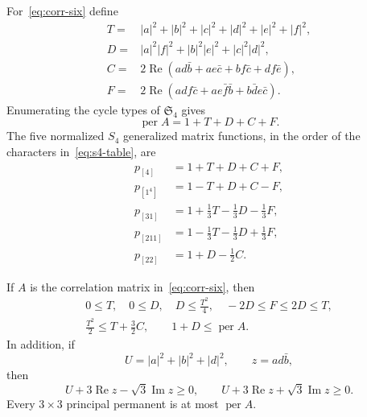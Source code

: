 \documentclass[10pt,twoside]{siamart1116}
\newcommand{\Sn}{\mathfrak S}
\newcommand{\per}{\operatorname{per}}
\newcommand{\Rea}{\operatorname{Re}}
\newcommand{\Ima}{\operatorname{Im}}
\begin{document}
For~\eqref{eq:corr-six} define
\begin{align}
 T={}&|a|^2+|b|^2+|c|^2+|d|^2+|e|^2+|f|^2,\label{eq:T}\\
 D={}&|a|^2|f|^2+|b|^2|e|^2+|c|^2|d|^2,\label{eq:D}\\
 C={}&2\Rea(a d\bar b+a e\bar c+b f\bar c+d f\bar e),\label{eq:C}\\
 F={}&2\Rea(a d f\bar c+a e\bar f\bar b+b\bar d e\bar c).
 \label{eq:F}
\end{align}
Enumerating the cycle types of $\Sn_4$ gives
\begin{equation}\label{eq:per-aggregate}
 \per A=1+T+D+C+F.
\end{equation}
The five normalized $S_4$ generalized matrix functions, in the order of
the characters in~\eqref{eq:s4-table}, are
\begin{align}
 p_{[4]}&=1+T+D+C+F,\nonumber\\
 p_{[1^4]}&=1-T+D+C-F,\nonumber\\
 p_{[31]}&=1+\tfrac13T-\tfrac13D-\tfrac13F,\label{eq:s4-rows}\\
 p_{[211]}&=1-\tfrac13T-\tfrac13D+\tfrac13F,\nonumber\\
 p_{[22]}&=1+D-\tfrac12C.\nonumber
\end{align}

\begin{lemma}\label{lem:scalar-toolbox}
If $A$ is the correlation matrix in~\eqref{eq:corr-six}, then
\begin{gather}
 0\leq T,\quad 0\leq D,\quad
 D\leq\frac{T^2}{4},\quad
 -2D\leq F\leq2D\leq T,
 \label{eq:scalar-basic}\\
 \frac{T^2}{2}\leq T+\frac32C,
 \qquad 1+D\leq\per A.\label{eq:moment-bound}
\end{gather}
In addition, if
\begin{equation}\label{eq:triangle-data}
 U=|a|^2+|b|^2+|d|^2,\qquad z=ad\bar b,
\end{equation}
then
\begin{equation}\label{eq:triangle-character-bounds}
 U+3\Rea z-\sqrt3\Ima z\geq0,
 \qquad U+3\Rea z+\sqrt3\Ima z\geq0.
\end{equation}
Every $3\times3$ principal permanent is at most $\per A$.
\end{lemma}
\end{document}
